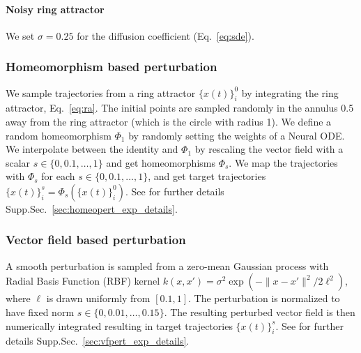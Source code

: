 \documentclass{article}
\theoremstyle{definition} \newtheorem{definition}{Definition}  \newtheorem{example}{Example}
\theoremstyle{remark} \newtheorem{remark}{Remark}
\newcounter{ct}
\begin{document}
\paragraph{Noisy ring attractor}
We set $\sigma = 0.25$ for the diffusion coefficient (Eq.~\ref{eq:sde}).


\subsubsection{Homeomorphism based perturbation}\label{sec:homeopert_exp_description}
We sample trajectories from a ring attractor $\{x(t)\}_i^0$ by integrating the ring attractor, Eq.~\ref{eq:ra}.
The initial points are sampled randomly in the annulus 0.5 away from the ring attractor (which is the circle with radius 1).
%
We define a random homeomorphism $\Phi_1$ by randomly setting the weights of a Neural ODE.
%
We interpolate between the identity and $\Phi_1$ by rescaling the vector field with a scalar $s \in \{0, 0.1, \dots, 1\}$ and get homeomorphisms $\Phi_s$.
%
We map the trajectories with $\Phi_s$ for each $s\in \{0, 0.1, \dots, 1\}$, and get target trajectories $\{x(t)\}_i^s = \Phi_s(\{x(t)\}_i^0)$.
%
See for further details  Supp.Sec.~\ref{sec:homeopert_exp_details}.



\subsubsection{Vector field based perturbation}\label{sec:vfpert_exp_description}
 A smooth perturbation is sampled from a zero-mean Gaussian process with Radial Basis Function (RBF) kernel $k(x, x') = \sigma^2 \exp(-\|x - x'\|^2 / 2\ell^2)$, where $\ell$ is drawn uniformly from $[0.1, 1]$.
The perturbation is normalized to have fixed norm $s \in \{0, 0.01, \dots, 0.15\}$.
%
The resulting perturbed vector field is then numerically integrated resulting in target trajectories $\{x(t)\}_i^s$.
%
See for further details  Supp.Sec.~\ref{sec:vfpert_exp_details}.
\end{document}
